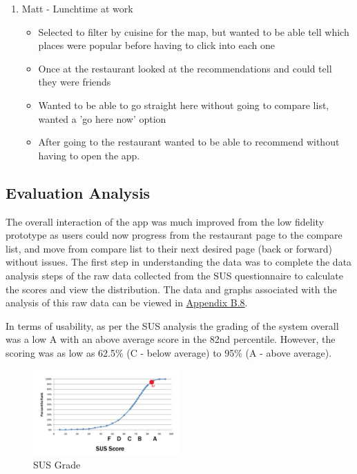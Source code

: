 \documentclass[a4 paper, 12pt]{article}
\begin{document}
\begin{enumerate}
            \item Matt - Lunchtime at work
                \begin{itemize}
                    \item Selected to filter by cuisine for the map, but wanted to be able tell which places were popular before having to click into each one
                    \item Once at the restaurant looked at the recommendations and could tell they were friends
                    \item Wanted to be able to go straight here without going to compare list, wanted a 'go here now' option
                    \item After going to the restaurant wanted to be able to recommend without having to open the app.
                \end{itemize}
        \end{enumerate}

    \subsection{Evaluation Analysis}
    The overall interaction of the app was much improved from the low fidelity prototype as users could now progress from the restaurant page to the compare list, and move from compare list to their next desired page (back or forward) without issues. The first step in understanding the data was to complete the data analysis steps of the raw data collected from the SUS questionnaire to calculate the scores and view the distribution. The data and graphs associated with the analysis of this raw data can be viewed in \hyperref[sec:B.8]{Appendix B.8}.

    In terms of usability, as per the SUS analysis the grading of the system overall was a low A with an above average score in the 82nd percentile. However, the scoring was as low as 62.5\% (C - below average) to 95\% (A - above average). 
    \begin{figure}[H]
        \centering
        \includegraphics[width=0.5\textwidth, frame]
            {./Med_Fidelity/Med_Report/images/Med_SUS_Grade.PNG} 
        \caption{SUS Grade}
    \end{figure}   
        
\end{document}
